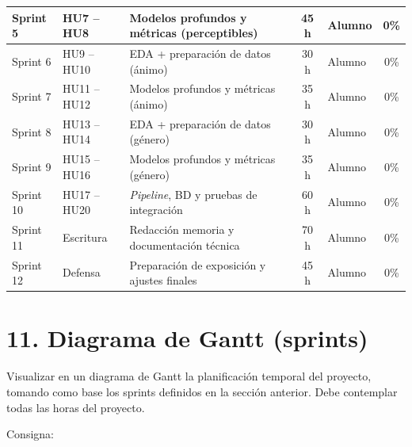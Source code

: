 \documentclass[
11pt, %
]{charter}
\begin{document}
\begin{table}[htpb]
\begin{tabularx}{\linewidth}{@{}|l|l|X|c|l|c|@{}}
Sprint 5 & HU7 – HU8 & Modelos profundos y métricas (perceptibles) & 45 h & Alumno & 0\% \\ \hline
Sprint 6 & HU9 – HU10 & EDA + preparación de datos (ánimo) & 30 h & Alumno & 0\% \\ \hline
Sprint 7 & HU11 – HU12 & Modelos profundos y métricas (ánimo) & 35 h & Alumno & 0\% \\ \hline
Sprint 8 & HU13 – HU14 & EDA + preparación de datos (género) & 30 h & Alumno & 0\% \\ \hline
Sprint 9 & HU15 – HU16 & Modelos profundos y métricas (género) & 35 h & Alumno & 0\% \\ \hline
Sprint 10 & HU17 – HU20 & \textit{Pipeline}, BD y pruebas de integración & 60 h & Alumno & 0\% \\ \hline
Sprint 11 & Escritura & Redacción memoria y documentación técnica & 70 h & Alumno & 0\% \\ \hline
Sprint 12 & Defensa & Preparación de exposición y ajustes finales & 45 h & Alumno & 0\% \\ \hline

\end{tabularx}
\end{table}



\section{11. Diagrama de Gantt (sprints)}
\label{sec:gantt}

Visualizar en un diagrama de Gantt la planificación temporal del proyecto, tomando como base los sprints definidos en la sección anterior. Debe contemplar todas las horas del proyecto.

Consigna:
\end{document}
